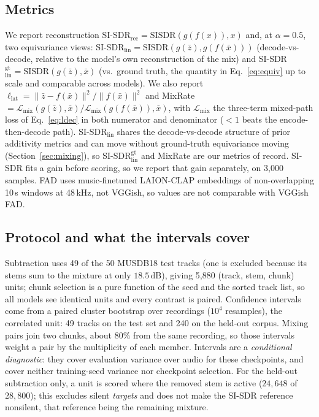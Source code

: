 \documentclass[conference]{IEEEtran}
\newcommand{\secref}[1]{Section~\ref{#1}}
\begin{document}
\subsection{Metrics}\label{sec:metrics}
We report reconstruction SI-SDR$_\mathrm{rec}=\mathrm{SISDR}(g(f(x)),x)$ and,
at $\alpha{=}0.5$, two equivariance views:
SI-SDR$_\mathrm{lin}=\mathrm{SISDR}(g(\bar{z}),g(f(\bar{x})))$
(decode-vs-decode, relative to the model's own reconstruction of the mix) and
SI-SDR$_\mathrm{lin}^\mathrm{gt}=\mathrm{SISDR}(g(\bar{z}),\bar{x})$ (vs.\
ground truth, the quantity in Eq.~\ref{eq:equiv} up to scale and comparable
across models). We also report
$\ell_\mathrm{lat}=\lVert\bar{z}-f(\bar{x})\rVert^2/\lVert f(\bar{x})\rVert^2$
and MixRate $=\mathcal{L}_\mathrm{mix}(g(\bar{z}),\bar{x})/
\mathcal{L}_\mathrm{mix}(g(f(\bar{x})),\bar{x})$, with
$\mathcal{L}_\mathrm{mix}$ the three-term mixed-path loss of
Eq.~\ref{eq:ldec} in both numerator and denominator ($<1$ beats the
encode-then-decode path). SI-SDR$_\mathrm{lin}$ shares the decode-vs-decode structure of prior
additivity metrics \cite{torres2026linearity} and can move without ground-truth equivariance moving (\secref{sec:mixing}), so SI-SDR$_\mathrm{lin}^\mathrm{gt}$ and MixRate are our metrics of record. SI-SDR
fits a gain before scoring, so we report that gain separately, on 3{,}000
samples. FAD uses music-finetuned LAION-CLAP embeddings of non-overlapping
10\,s windows at 48\,kHz, not VGGish, so values are not comparable with
VGGish FAD.

\subsection{Protocol and what the intervals cover}\label{sec:protocol-setup}
Subtraction uses 49 of the 50 MUSDB18 test tracks (one is excluded because
its stems sum to the mixture at only $18.5$\,dB), giving 5{,}880 (track,
stem, chunk) units; chunk selection is a pure function of the seed and the
sorted track list, so all models see identical units and every contrast is
paired. Confidence intervals come from a paired cluster bootstrap over recordings
($10^4$ resamples), the correlated unit: 49 tracks on the test set and 240
on the held-out corpus. Mixing pairs join two chunks, about $80\%$ from the same recording, so those
intervals weight a pair by the multiplicity of each member. Intervals are a \emph{conditional
diagnostic}: they cover evaluation variance over audio for these
checkpoints, and cover neither training-seed variance nor checkpoint
selection. For the held-out subtraction only, a unit is scored where the removed stem
is active ($24{,}648$ of $28{,}800$); this excludes silent \emph{targets}
and does not make the SI-SDR reference nonsilent, that reference being the
remaining mixture.
\end{document}
